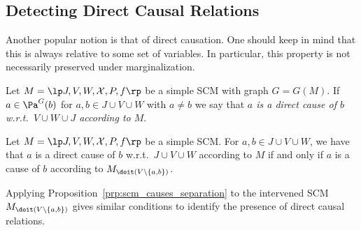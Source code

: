 \subsection{Detecting Direct Causal Relations}

Another popular notion is that of direct causation. One should keep in mind that this is always relative to some set of variables.
In particular, this property is not necessarily preserved under marginalization.
\begin{Def}
  Let $M = \lt \Sin, \Send, \Srnd, \CX, P, f \rt$ be a simple SCM with graph $G = G(M)$.
  If $a \in \Pa^G(b)$ for $a, b \in J \cup V \cup W$ with $a\ne b$ we say that \emph{$a$ is a direct cause of $b$ w.r.t.\ $V \cup W \cup J$ according to $M$}.
\end{Def}
\begin{Prp}
  Let $M = \lt \Sin, \Send, \Srnd, \CX, P, f \rt$ be a simple SCM.
  For $a,b \in J \cup V \cup W$, we have that $a$ is a direct cause of $b$ w.r.t.\ $J \cup V \cup W$ according to $M$ if and only if $a$ is a cause of $b$ according to $M_{\doit(V\setminus\{a,b\})}$.
\end{Prp}
Applying Proposition~\ref{prp:scm_causes_separation} to the intervened SCM $M_{\doit(V\setminus \{a,b\})}$
gives similar conditions to identify the presence of direct causal relations.
%
